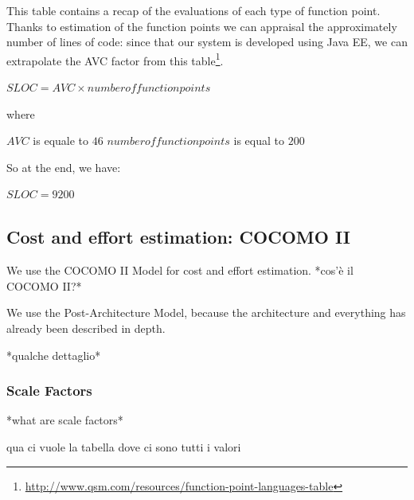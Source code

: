 \documentclass[english]{article}
\begin{document}
This table contains a recap of the evaluations of each type of function point.\\
Thanks to estimation of the function points we can appraisal the approximately number of lines of code: since that our system is developed using Java EE, we can extrapolate the AVC factor from this table\footnote{\href{http://www.qsm.com/resources/function-point-languages-table}{http://www.qsm.com/resources/function-point-languages-table}}. 

\begin{center}
$SLOC = AVC \times number of function points$
\end{center}

where

$ AVC $ is equale to $46$
$ number of function points$ is equal to $200$

So at the end, we have:

\begin{center}
$SLOC = 9200$
\end{center}

\subsection{Cost and effort estimation: COCOMO II}

We use the COCOMO II Model for cost and effort estimation.
*cos'è il COCOMO II?*

We use the Post-Architecture Model, because the architecture and everything has already been described in depth.

*qualche dettaglio*

\subsubsection{Scale Factors}

*what are scale factors*

qua ci vuole la tabella dove ci sono tutti i valori

\end{document}
